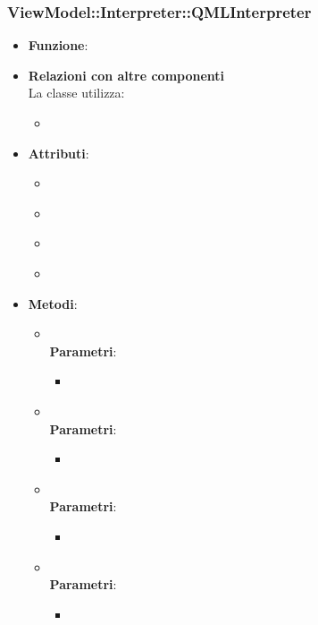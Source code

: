 \subsubsection{ViewModel::Interpreter::QMLInterpreter}
\begin{itemize}
\item\textbf{Funzione}:
\item\textbf{Relazioni con altre componenti}\\
La classe utilizza:
	\begin{itemize}
		\item
	\end{itemize}
\item\textbf{Attributi}:
	\begin{itemize}
		\item\code{}\\
		\item\code{}\\
		\item\code{}\\
		\item\code{}\\
	\end{itemize}
\item\textbf{Metodi}:
	\begin{itemize}
		\item\code{}\\
		\textbf{Parametri}:
			\begin{itemize}
				\item\code{}\\
			\end{itemize}
		\item\code{}\\
		\textbf{Parametri}:
			\begin{itemize}
				\item\code{}\\
			\end{itemize}
		\item\code{}\\
		\textbf{Parametri}:
			\begin{itemize}
				\item\code{}\\
			\end{itemize}
		\item\code{}\\
		\textbf{Parametri}:
			\begin{itemize}
				\item\code{}\\
			\end{itemize}
	\end{itemize}
\end{itemize}

